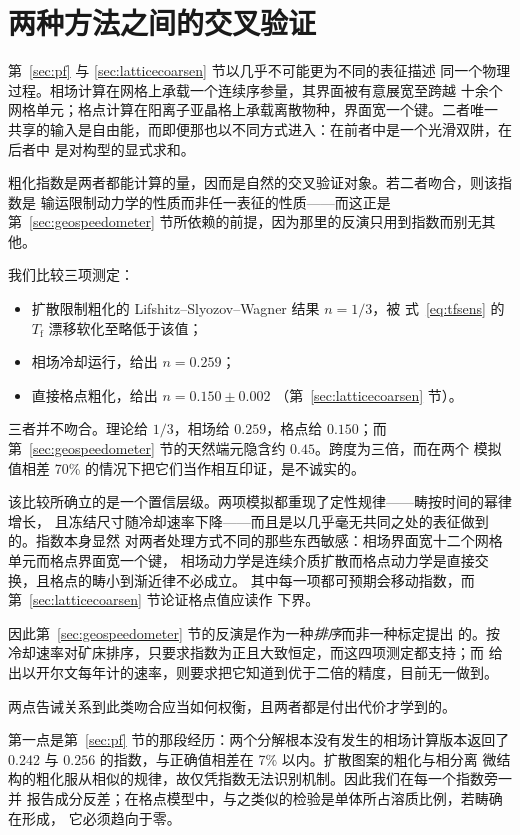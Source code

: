 \documentclass[11pt,a4paper]{ctexart}
\newcommand{\Tf}{T_{\mathrm{f}}}
\begin{document}
\section{两种方法之间的交叉验证}
\label{sec:crosscheck}

第~\ref{sec:pf} 与 \ref{sec:latticecoarsen} 节以几乎不可能更为不同的表征描述
同一个物理过程。相场计算在网格上承载一个连续序参量，其界面被有意展宽至跨越
十余个网格单元；格点计算在阳离子亚晶格上承载离散物种，界面宽一个键。二者唯一
共享的输入是自由能，而即便那也以不同方式进入：在前者中是一个光滑双阱，在后者中
是对构型的显式求和。

粗化指数是两者都能计算的量，因而是自然的交叉验证对象。若二者吻合，则该指数是
输运限制动力学的性质而非任一表征的性质——而这正是第~\ref{sec:geospeedometer}
节所依赖的前提，因为那里的反演只用到指数而别无其他。

我们比较三项测定：
\begin{itemize}\itemsep2pt
\item 扩散限制粗化的 Lifshitz--Slyozov--Wagner 结果 $n = 1/3$，被
      式~\eqref{eq:tfsens} 的 $\Tf$ 漂移软化至略低于该值；
\item 相场冷却运行，给出 $n = 0.259$；
\item 直接格点粗化，给出 $n = 0.150 \pm 0.002$
      （第~\ref{sec:latticecoarsen} 节）。
\end{itemize}

三者并不吻合。理论给 $1/3$，相场给 $0.259$，格点给 $0.150$；而
第~\ref{sec:geospeedometer} 节的天然端元隐含约 $0.45$。跨度为三倍，而在两个
模拟值相差 70\% 的情况下把它们当作相互印证，是不诚实的。

该比较所确立的是一个置信层级。两项模拟都重现了定性规律——畴按时间的幂律增长，
且冻结尺寸随冷却速率下降——而且是以几乎毫无共同之处的表征做到的。指数本身显然
对两者处理方式不同的那些东西敏感：相场界面宽十二个网格单元而格点界面宽一个键，
相场动力学是连续介质扩散而格点动力学是直接交换，且格点的畴小到渐近律不必成立。
其中每一项都可预期会移动指数，而第~\ref{sec:latticecoarsen} 节论证格点值应读作
下界。

因此第~\ref{sec:geospeedometer} 节的反演是作为一种\emph{排序}而非一种标定提出
的。按冷却速率对矿床排序，只要求指数为正且大致恒定，而这四项测定都支持；而
给出以开尔文每年计的速率，则要求把它知道到优于二倍的精度，目前无一做到。

两点告诫关系到此类吻合应当如何权衡，且两者都是付出代价才学到的。

第一点是第~\ref{sec:pf} 节的那段经历：两个分解根本没有发生的相场计算版本返回了
$0.242$ 与 $0.256$ 的指数，与正确值相差在 7\% 以内。扩散图案的粗化与相分离
微结构的粗化服从相似的规律，故仅凭指数无法识别机制。因此我们在每一个指数旁一并
报告成分反差；在格点模型中，与之类似的检验是单体所占溶质比例，若畴确在形成，
它必须趋向于零。
\end{document}
